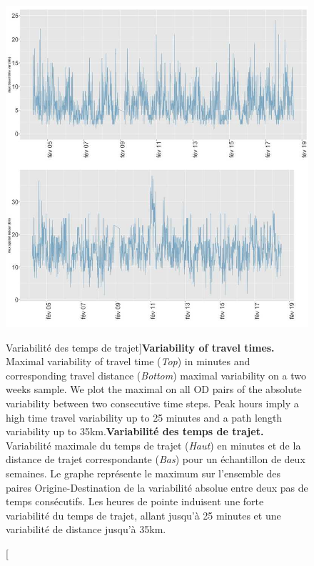 \begin{figure}
\includegraphics[width=\linewidth]{Figures/Final/8-1-2-fig-transportationequilibrium-fig-3.jpg}
\caption[Variability of travel times][Variabilité des temps de trajet]{\textbf{Variability of travel times.} Maximal variability of travel time (\textit{Top}) in minutes and corresponding travel distance (\textit{Bottom}) maximal variability on a two weeks sample. We plot the maximal on all OD pairs of the absolute variability between two consecutive time steps. Peak hours imply a high time travel variability up to 25 minutes and a path length variability up to 35km.\label{fig:transportationequilibrium:fig-3}}{\textbf{Variabilité des temps de trajet.} Variabilité maximale du temps de trajet (\textit{Haut}) en minutes et de la distance de trajet correspondante (\textit{Bas}) pour un échantillon de deux semaines. Le graphe représente le maximum sur l'ensemble des paires Origine-Destination de la variabilité absolue entre deux pas de temps consécutifs. Les heures de pointe induisent une forte variabilité du temps de trajet, allant jusqu'à 25 minutes et une variabilité de distance jusqu'à 35km.\label{fig:transportationequilibrium:fig-3}}
\end{figure}




